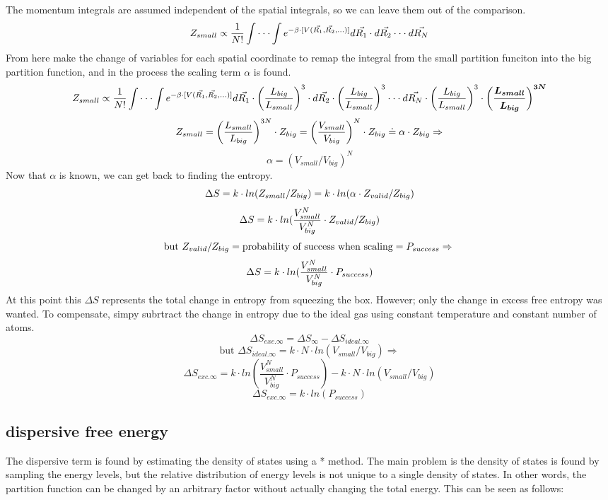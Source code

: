 The momentum integrals are assumed independent of the spatial integrals, so we can leave them out of the comparison.
$$\newline Z_{small}\propto\frac{1}{N!}\int\cdot\cdot\cdot\int e^{-\beta\cdot [V(\vec{R_1},\vec{R_2},...)]} d\vec{R_1}\cdot d\vec{R_2}\cdot\cdot\cdot d\vec{R_N}$$
From here make the change of variables for each spatial coordinate to remap the integral from the small partition funciton into the big partition function, and in the process the scaling term $\alpha$ is found.
$$\newline Z_{small}\propto\frac{1}{N!}\int\cdot\cdot\cdot\int e^{-\beta\cdot [V(\vec{R_1},\vec{R_2},...)]} d\vec{R_1}\cdot \left(\frac{L_{big}}{L_{small}}\right)^3 \cdot d\vec{R_2}\cdot \left(\frac{L_{big}}{L_{small}}\right)^3 \cdot\cdot\cdot d\vec{R_N}\cdot \left(\frac{L_{big}}{L_{small}}\right)^3 \cdot \boldsymbol{\left(\frac{L_{small}}{L_{big}}\right)^{3N}}$$
$$\newline Z_{small}=\left(\frac{L_{small}}{L_{big}}\right)^{3N}\cdot Z_{big}=\left(\frac{V_{small}}{V_{big}}\right)^N\cdot Z_{big}\doteq\alpha\cdot Z_{big} \Rightarrow$$
$$\alpha=(V_{small}/V_{big})^N$$
Now that $\alpha$ is known, we can get back to finding the entropy.
$$\Delta S=k\cdot ln(Z_{small}/Z_{big})=k\cdot ln(\alpha\cdot Z_{valid}/Z_{big})\newline$$
$$\Delta S=k\cdot ln(\frac{V_{small}^N}{V_{big}^N}\cdot Z_{valid}/Z_{big})\newline$$
$$\text{but }Z_{valid}/Z_{big}=\text{probability of success when scaling}=P_{success}\Rightarrow\newline$$
$$\Delta S=k\cdot ln(\frac{V_{small}^N}{V_{big}^N}\cdot P_{success}
)\newline$$
At this point this $\Delta S$ represents the total change in entropy from squeezing the box. However; only the change in excess free entropy was wanted. To compensate, simpy subrtract the change in entropy due to the ideal gas using constant temperature and constant number of atoms.
$$\Delta S_{exc.\infty}=\Delta S_{\infty}-\Delta S_{ideal.\infty}$$
$$\text{but }\Delta S_{ideal.\infty}=k\cdot N\cdot ln(V_{small}/V_{big})\Rightarrow$$
$$\Delta S_{exc.\infty}=k\cdot ln(\frac{V_{small}^N}{V_{big}^N}\cdot P_{success})-k\cdot N\cdot ln(V_{small}/V_{big})$$
$$\Delta S_{exc.\infty}=k\cdot ln(P_{success})$$


\subsection{dispersive free energy}
The dispersive term is found by estimating the density of states using a * method. The main problem is the density of states is found by sampling the energy levels, but the relative distribution of energy levels is not unique to a single density of states. In other words, the partition function can be changed by an arbitrary factor without actually changing the total energy. This can be seen as follows:

